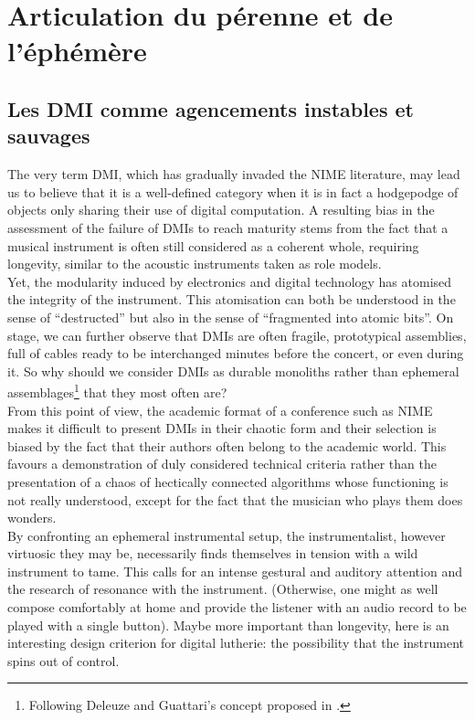 \section{Articulation du pérenne et de l'éphémère}
\subsection{Les DMI comme agencements instables et sauvages}
The very term DMI, which has gradually invaded the NIME literature, may lead us to believe that it is a well-defined category when it is in fact a hodgepodge of objects only sharing their use of digital computation. A resulting bias in the assessment of the failure of DMIs to reach maturity stems from the fact that a musical instrument is often still considered as a coherent whole, requiring longevity, similar to the acoustic instruments taken as role models.\\
\indent Yet, the modularity induced by electronics and digital technology has atomised the integrity of the instrument. This atomisation can both be understood in the sense of “destructed” but also in the sense of “fragmented into atomic bits”. On stage, we can further observe that DMIs are often fragile, prototypical assemblies, full of cables ready to be interchanged minutes before the concert, or even during it. So why should we consider DMIs as durable monoliths rather than ephemeral assemblages\footnote{Following Deleuze and Guattari's concept proposed in \cite{deleuze_mille_1980}.} that they most often are?\\
\indent From this point of view, the academic format of a conference such as NIME makes it difficult to present DMIs in their chaotic form and their selection is biased by the fact that their authors often belong to the academic world. This favours a demonstration of duly considered technical criteria rather than the presentation of a chaos of hectically connected algorithms whose functioning is not really understood, except for the fact that the musician who plays them does wonders.\\
\indent By confronting an ephemeral instrumental setup, the instrumentalist, however virtuosic they may be, necessarily finds themselves in tension with a wild instrument to tame. This calls for an intense gestural and auditory attention and the research of resonance with the instrument. (Otherwise, one might as well compose comfortably at home and provide the listener with an audio record to be played with a single button). Maybe more important than longevity, here is an interesting design criterion for digital lutherie: the possibility that the instrument spins out of control.


